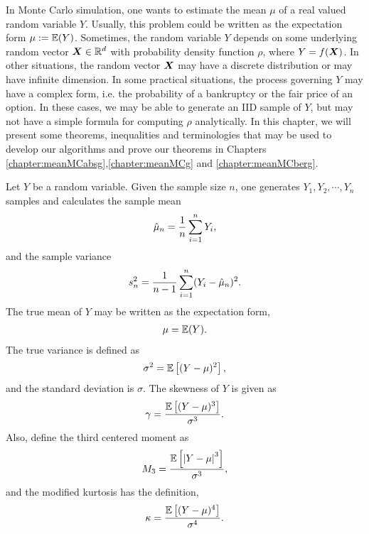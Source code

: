 \documentclass{iitthesis}
\theoremstyle{definition}
\begin{document}
\label{basicInequalities}

In Monte Carlo simulation, one wants to estimate the mean $\mu$ of a real valued random variable $Y$. Usually, this problem could be written as the expectation form $\mu:=\mathbb{E}(Y)$. Sometimes, the random variable $Y$ depends on some underlying random vector $\boldsymbol{X} \in \mathbb{R}^d$ with probability density function $\rho$, where $Y = f(\boldsymbol{X})$. In other situations, the random vector $\boldsymbol{X}$ may have a discrete distribution or may have infinite dimension. In some practical situations, the process governing $Y$ may have a complex form, i.e. the probability of a bankruptcy or the fair price of an option. In these cases, we may be able to generate an IID sample of $Y$, but may not have a simple formula for computing $\rho$ analytically. 
In this chapter, we will present some theorems, inequalities and terminologies that may be used to develop our algorithms and prove our theorems in Chapters \ref{chapter:meanMCabsg},\ref{chapter:meanMCg} and \ref{chapter:meanMCberg}.


Let $Y$ be a random variable. Given the sample size $n$, one generates $Y_1, Y_2, \cdots, Y_n$ samples and calculates the sample mean 
\begin{align}\label{samplemean}
\hat{\mu}_n = \frac1n\sum_{i=1}^n Y_i,
\end{align}
and the sample variance
\begin{align}\label{samplevar}
s^2_n = \frac{1}{n-1}\sum_{i=1}^n (Y_i-\hat{\mu}_n)^2.
\end{align}
The true mean of $Y$ may be written as the expectation form,
\begin{align}\label{truemean}
\mu = \mathbb{E}(Y).
\end{align}
The true variance is defined as
\begin{align}\label{truevar}
\sigma^2 = \mathbb{E}\left[(Y-\mu)^2\right],
\end{align}
and the standard deviation is $\sigma$. The skewness of $Y$ is given as 
\begin{align*}%
\gamma = \frac{\e\left[(Y-\mu)^3\right]}{\sigma^3}.
\end{align*}
Also, define the third centered moment as
\begin{align}\label{def:M3}
M_3 = \frac{\mathbb{E}\left[\left \lvert Y-\mu \right \rvert^3\right]}{\sigma^3},
\end{align}
and the modified kurtosis has the definition,
\begin{align}\label{kurtosis}
\kappa = \frac{\mathbb{E}\left[(Y-\mu)^4\right]}{\sigma^4}.
\end{align}
\end{document}
